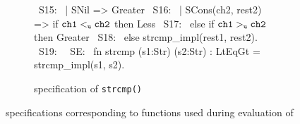 \begin{figure}[H]
\begin{subfigure}[b]{\textwidth}
\begin{center}
\begin{allLangEnvFoot}
~{\tiny \textcolor{mygray}{S15:}}~                          | SNil => Greater
~{\tiny \textcolor{mygray}{S16:}}~                          | SCons(ch2, rest2) => if ${\tt ch1 <_{u} ch2}$ then Less
~{\tiny \textcolor{mygray}{S17:}}~                                                 else if ${\tt ch1 >_{u} ch2}$ then Greater
~{\tiny \textcolor{mygray}{S18:}}~                                                 else strcmp_impl(rest1, rest2).
~{\tiny \textcolor{mygray}{S19:}}~ 
~{\tiny \textcolor{mygray}{SE:\phantom{ }}}~ fn strcmp (s1:Str) (s2:Str) : LtEqGt = strcmp_impl(s1, s2).
\end{allLangEnvFoot}
\end{center}
\caption{\SpecL{} specification of {\tt strcmp()}}
\end{subfigure}
\caption{\label{fig:specifications}\SpecL{} specifications corresponding to functions used during evaluation of \toolName{}}
\end{figure}
